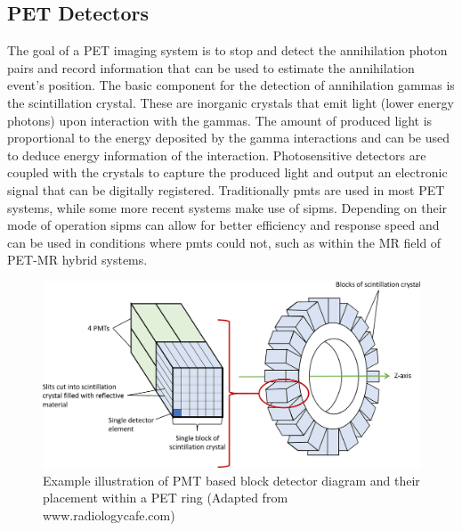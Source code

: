 \subsection{PET Detectors}
The goal of a PET imaging system is to stop and detect the annihilation photon pairs and record information that can be used to estimate the annihilation event's position.
The basic component for the detection of annihilation gammas is the scintillation crystal. These are inorganic crystals that emit light (lower energy photons) upon interaction with the gammas. The amount of produced light is proportional to the energy deposited by the gamma interactions and can be used to deduce energy information of the interaction. Photosensitive detectors are coupled with the crystals to capture the produced light and output an electronic signal that can be digitally registered. Traditionally \glspl{pmt} are used in most PET systems, while some more recent systems make use of \glspl{sipm}. Depending on their mode of operation \glspl{sipm} can allow for better efficiency and response speed and can be used in conditions where \glspl{pmt} could not, such as within the MR field of PET-MR hybrid systems.
%
\begin{figure} [h!]
\centering
\includegraphics[scale=0.28,angle=0]{2_Theory_Methods/figures/block_detector.png}
\caption{Example illustration of PMT based block detector diagram and their placement within a PET ring (Adapted from www.radiologycafe.com) } 
\label{fig_2:BlockDetectorAndRing}
\end{figure} 
